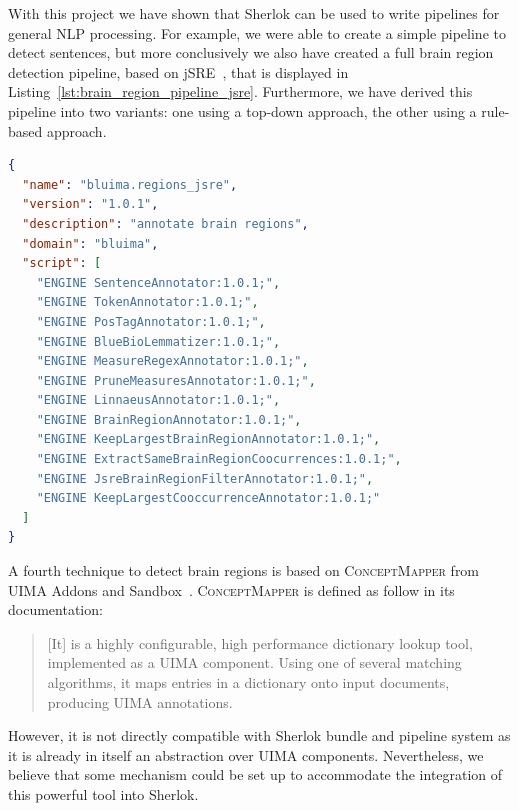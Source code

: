 \documentclass{article}
\newcommand{\ID}[1]{{\textsc{#1}}}
\begin{document}
With this project we have shown that Sherlok can be used to write pipelines for general NLP
processing. For example, we were able to create a simple pipeline to detect sentences, but more
conclusively we also have created a full brain region detection pipeline, based on
jSRE~\cite{jsre_2006}, that is displayed in Listing~\ref{lst:brain_region_pipeline_jsre}.
Furthermore, we have derived this pipeline into two variants: one using a top-down approach, the
other using a rule-based approach.

\begin{lstlisting}[float,language=json,
                   caption=jSRE brain region pipeline,
                   label=lst:brain_region_pipeline_jsre]
{
  "name": "bluima.regions_jsre",
  "version": "1.0.1",
  "description": "annotate brain regions",
  "domain": "bluima",
  "script": [
    "ENGINE SentenceAnnotator:1.0.1;",
    "ENGINE TokenAnnotator:1.0.1;",
    "ENGINE PosTagAnnotator:1.0.1;",
    "ENGINE BlueBioLemmatizer:1.0.1;",
    "ENGINE MeasureRegexAnnotator:1.0.1;",
    "ENGINE PruneMeasuresAnnotator:1.0.1;",
    "ENGINE LinnaeusAnnotator:1.0.1;",
    "ENGINE BrainRegionAnnotator:1.0.1;",
    "ENGINE KeepLargestBrainRegionAnnotator:1.0.1;",
    "ENGINE ExtractSameBrainRegionCoocurrences:1.0.1;",
    "ENGINE JsreBrainRegionFilterAnnotator:1.0.1;",
    "ENGINE KeepLargestCooccurrenceAnnotator:1.0.1;"
  ]
}
\end{lstlisting}

A fourth technique to detect brain regions is based on \ID{ConceptMapper} from UIMA Addons and
Sandbox~\cite{uima_sandbox}. \ID{ConceptMapper} is defined as follow in its documentation:

\begin{quotation}
    [It] is a highly configurable, high performance dictionary lookup tool, implemented as a UIMA
    component. Using one of several matching algorithms, it maps entries in a dictionary onto input
    documents, producing UIMA annotations.
\end{quotation}

However, it is not directly compatible with Sherlok bundle and pipeline system as it is already in
itself an abstraction over UIMA components. Nevertheless, we believe that some mechanism could be
set up to accommodate the integration of this powerful tool into Sherlok.
\end{document}
